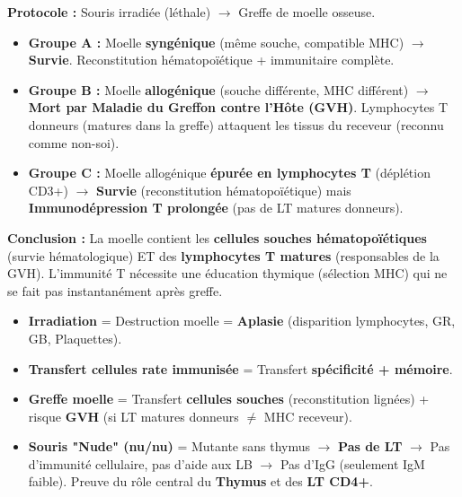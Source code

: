 \documentclass[11pt]{article}
\begin{document}
\begin{experience}
\textbf{Protocole :} Souris irradiée (léthale) $\rightarrow$ Greffe de moelle osseuse.
\begin{itemize}
    \item \textbf{Groupe A :} Moelle \textbf{syngénique} (même souche, compatible MHC) $\rightarrow$ \textbf{Survie}. Reconstitution hématopoïétique + immunitaire complète.
    \item \textbf{Groupe B :} Moelle \textbf{allogénique} (souche différente, MHC différent) $\rightarrow$ \textbf{Mort par Maladie du Greffon contre l'Hôte (GVH)}. Lymphocytes T donneurs (matures dans la greffe) attaquent les tissus du receveur (reconnu comme non-soi).
    \item \textbf{Groupe C :} Moelle allogénique \textbf{épurée en lymphocytes T} (déplétion CD3+) $\rightarrow$ \textbf{Survie} (reconstitution hématopoïétique) mais \textbf{Immunodépression T prolongée} (pas de LT matures donneurs).
\end{itemize}
\textbf{Conclusion :} La moelle contient les \textbf{cellules souches hématopoïétiques} (survie hématologique) ET des \textbf{lymphocytes T matures} (responsables de la GVH). L'immunité T nécessite une éducation thymique (sélection MHC) qui ne se fait pas instantanément après greffe.
\end{experience}

\begin{attention}
\begin{itemize}
    \item \textbf{Irradiation} = Destruction moelle = \textbf{Aplasie} (disparition lymphocytes, GR, GB, Plaquettes).
    \item \textbf{Transfert cellules rate immunisée} = Transfert \textbf{spécificité + mémoire}.
    \item \textbf{Greffe moelle} = Transfert \textbf{cellules souches} (reconstitution lignées) + risque \textbf{GVH} (si LT matures donneurs $\neq$ MHC receveur).
    \item \textbf{Souris "Nude" (nu/nu)} = Mutante sans thymus $\rightarrow$ \textbf{Pas de LT} $\rightarrow$ Pas d'immunité cellulaire, pas d'aide aux LB $\rightarrow$ Pas d'IgG (seulement IgM faible). Preuve du rôle central du \textbf{Thymus} et des \textbf{LT CD4+}.
\end{itemize}
\end{attention}
\end{document}
